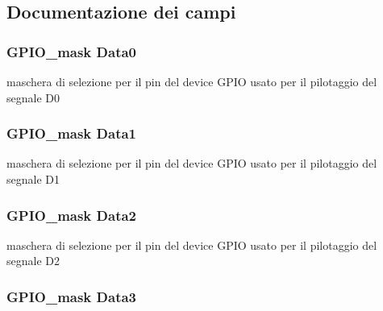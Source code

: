 \subsection{Documentazione dei campi}
\hypertarget{struct_h_d44780___l_c_d__t_aed1ef3393be1a14aa7b2644585e5bb08}{
\subsubsection[{Data0}]{\setlength{\rightskip}{0pt plus 5cm}G\+P\+I\+O\+\_\+mask Data0}}\label{struct_h_d44780___l_c_d__t_aed1ef3393be1a14aa7b2644585e5bb08}
maschera di selezione per il pin del device G\+P\+I\+O usato per il pilotaggio del segnale D0 \hypertarget{struct_h_d44780___l_c_d__t_a9b310a22b76c920feb015a3a3084b125}{
\subsubsection[{Data1}]{\setlength{\rightskip}{0pt plus 5cm}G\+P\+I\+O\+\_\+mask Data1}}\label{struct_h_d44780___l_c_d__t_a9b310a22b76c920feb015a3a3084b125}
maschera di selezione per il pin del device G\+P\+I\+O usato per il pilotaggio del segnale D1 \hypertarget{struct_h_d44780___l_c_d__t_afb22274224118a94688f1809cda55501}{
\subsubsection[{Data2}]{\setlength{\rightskip}{0pt plus 5cm}G\+P\+I\+O\+\_\+mask Data2}}\label{struct_h_d44780___l_c_d__t_afb22274224118a94688f1809cda55501}
maschera di selezione per il pin del device G\+P\+I\+O usato per il pilotaggio del segnale D2 \hypertarget{struct_h_d44780___l_c_d__t_ae6f2e7b5a4aa8b82451e021f2f5b3a89}{
\subsubsection[{Data3}]{\setlength{\rightskip}{0pt plus 5cm}G\+P\+I\+O\+\_\+mask Data3}}\label{struct_h_d44780___l_c_d__t_ae6f2e7b5a4aa8b82451e021f2f5b3a89}
